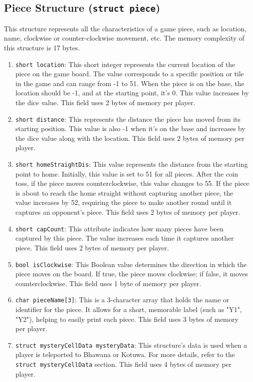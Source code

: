 \documentclass{article}
\begin{document}
\subsection{Piece Structure (\texttt{struct piece})}
This structure represents all the characteristics of a game piece, such as location, name, clockwise or counter-clockwise movement, etc. The memory complexity of this structure is 17 bytes.

\begin{enumerate}
    \item \texttt{short location}: This short integer represents the current location of the piece on the game board. The value corresponds to a specific position or tile in the game and can range from -1 to 51. When the piece is on the base, the location should be -1, and at the starting point, it’s 0. This value increases by the dice value. This field uses 2 bytes of memory per player.
    \item \texttt{short distance}: This represents the distance the piece has moved from its starting position. This value is also -1 when it’s on the base and increases by the dice value along with the location. This field uses 2 bytes of memory per player.
    \item \texttt{short homeStraightDis}: This value represents the distance from the starting point to home. Initially, this value is set to 51 for all pieces. After the coin toss, if the piece moves counterclockwise, this value changes to 55. If the piece is about to reach the home straight without capturing another piece, the value increases by 52, requiring the piece to make another round until it captures an opponent's piece. This field uses 2 bytes of memory per player.
    \item \texttt{short capCount}: This attribute indicates how many pieces have been captured by this piece. The value increases each time it captures another piece. This field uses 2 bytes of memory per player.
    \item \texttt{bool isClockwise}: This Boolean value determines the direction in which the piece moves on the board. If true, the piece moves clockwise; if false, it moves counterclockwise. This field uses 1 byte of memory per player.
    \item \texttt{char pieceName[3]}: This is a 3-character array that holds the name or identifier for the piece. It allows for a short, memorable label (such as "Y1", "Y2"), helping to easily print each piece. This field uses 3 bytes of memory per player.
    \item \texttt{struct mysteryCellData mysteryData}: This structure's data is used when a player is teleported to Bhawana or Kotuwa. For more details, refer to the \texttt{struct mysteryCellData} section. This field uses 4 bytes of memory per player.
\end{enumerate}
\end{document}

